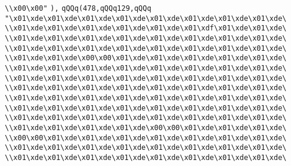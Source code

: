 \verb|\\x00\x00"|\newline
\verb|),|\newline
\verb|qQQq(478,qQQq129,qQQq|\newline
\verb|"\x01\xde\x01\xde\x01\xde\x01\xde\x01\xde\x01\xde\x01\xde\x01\xde\|\newline
\verb|\\x01\xde\x01\xde\x01\xde\x01\xde\x01\xde\x01\xdf\x01\xde\x01\xde\|\newline
\verb|\\x01\xde\x01\xde\x01\xde\x01\xde\x01\xde\x01\xde\x01\xde\x01\xde\|\newline
\verb|\\x01\xde\x01\xde\x01\xde\x01\xde\x01\xde\x01\xde\x01\xde\x01\xde\|\newline
\verb|\\x01\xde\x01\xde\x00\x00\x01\xde\x01\xde\x01\xde\x01\xde\x01\xde\|\newline
\verb|\\x01\xde\x01\xde\x01\xde\x01\xde\x01\xde\x01\xde\x01\xde\x01\xde\|\newline
\verb|\\x01\xde\x01\xde\x01\xde\x01\xde\x01\xde\x01\xde\x01\xde\x01\xde\|\newline
\verb|\\x01\xde\x01\xde\x01\xde\x01\xde\x01\xde\x01\xde\x01\xde\x01\xde\|\newline
\verb|\\x01\xde\x01\xde\x01\xde\x01\xde\x01\xde\x01\xde\x01\xde\x01\xde\|\newline
\verb|\\x01\xde\x01\xde\x01\xde\x01\xde\x01\xde\x01\xde\x01\xde\x01\xde\|\newline
\verb|\\x01\xde\x01\xde\x01\xde\x01\xde\x01\xde\x01\xde\x01\xde\x01\xde\|\newline
\verb|\\x01\xde\x01\xde\x01\xde\x01\xde\x00\x00\x01\xde\x01\xde\x01\xde\|\newline
\verb|\\x00\x00\x01\xde\x01\xde\x01\xde\x01\xde\x01\xde\x01\xde\x01\xde\|\newline
\verb|\\x01\xde\x01\xde\x01\xde\x01\xde\x01\xde\x01\xde\x01\xde\x01\xde\|\newline
\verb|\\x01\xde\x01\xde\x01\xde\x01\xde\x01\xde\x01\xde\x01\xde\x01\xde\|\newline
